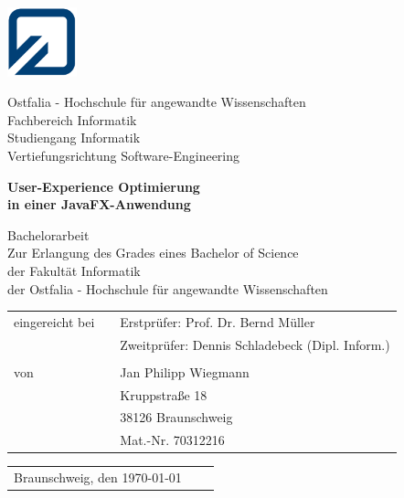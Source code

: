 
\begin{titlepage}

	\thispagestyle{empty}
	
	\begin{minipage}{2.1cm}
		\includegraphics[width=2cm]{grafiken/fh_logo_klein.jpg}
	\end{minipage}
	\begin{minipage}{10.0cm}
		Ostfalia - Hochschule für angewandte Wissenschaften\\
		Fachbereich Informatik\\
		Studiengang Informatik\\
		Vertiefungsrichtung Software-Engineering
	\end{minipage}

	\vspace{15mm}

	\begin{center}
		\LARGE \textbf{User-Experience Optimierung \\ in einer JavaFX-Anwendung\\[10mm]}
	\end{center}
	
	\begin{center}
		\normalsize Bachelorarbeit\\[1cm]
		Zur Erlangung des Grades eines Bachelor of Science\\ 
		der Fakultät Informatik\\
		der Ostfalia - Hochschule für angewandte Wissenschaften\\[10mm]
	\end{center}

	\begin{table}[h]
		\centering
		\hspace{50mm}\begin{tabular}{lcl}
			eingereicht bei &  & Erstprüfer: Prof. Dr. Bernd Müller\\
			& & Zweitprüfer: Dennis Schladebeck (Dipl. Inform.)\\
			& & \\
			von & & Jan Philipp Wiegmann\\
			& & Kruppstraße 18\\
			& & 38126 Braunschweig\\
			& & Mat.-Nr. 70312216\\
		\end{tabular}
	\end{table}

	\vspace{20mm}

	\begin{table}[h]
		\begin{tabular}{lll}
			Braunschweig, den \today\\
		\end{tabular}
	\end{table}

\end{titlepage}

